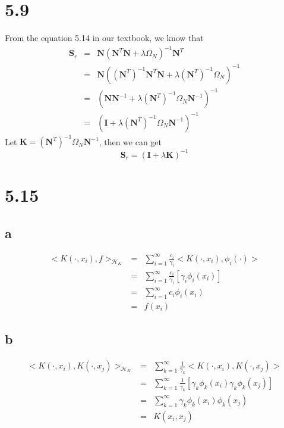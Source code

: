 \documentclass[11pt, oneside]{article}   	%
\begin{document}
\section{5.9}
From the equation 5.14 in our textbook, we know that 
\begin{eqnarray}
\mathbf{S}_r &=& \mathbf{N} (\mathbf{N}^T\mathbf{N} + \lambda \Omega_N)^{-1}\mathbf{N}^{T} \\
&=& \mathbf{N} ((\mathbf{N}^{T} )^{-1} \mathbf{N}^T\mathbf{N}+ \lambda (\mathbf{N}^{T} )^{-1} \Omega_N)^{-1}\\
&=&   (\mathbf{N} \mathbf{N} ^{-1}+ \lambda (\mathbf{N}^{T} )^{-1} \Omega_N\mathbf{N} ^{-1})^{-1}\\
&=&   (\mathbf{I} + \lambda (\mathbf{N}^{T} )^{-1} \Omega_N\mathbf{N} ^{-1})^{-1}
\end{eqnarray}
Let $\mathbf{K} = (\mathbf{N}^{T} )^{-1} \Omega_N\mathbf{N} ^{-1}$, then we can get
\begin{equation}
\mathbf{S}_r = (\mathbf{I} + \lambda \mathbf{K} )^{-1}
\end{equation}

\section{5.15}
\subsection{a}

\begin{eqnarray}
<K(\cdot, x_i), f>_{\mathcal{H}_K} &=& \sum_{i=1}^{\infty} \frac{c_i}{\gamma_i} <K(\cdot, x_i), \phi_i(\cdot)>\\
&=& \sum_{i=1}^{\infty} \frac{c_i}{\gamma_i} [\gamma_i\phi_i(x_i)]\\
&=& \sum_{i=1}^{\infty} c_i \phi_i(x_i) \\
&=& f(x_i)
\end{eqnarray}

\subsection{b}

\begin{eqnarray}
<K(\cdot, x_i), K(\cdot, x_j)>_{\mathcal{H}_K} &=& \sum_{k=1}^{\infty} \frac{1}{\gamma_k} <K(\cdot, x_i), K(\cdot, x_j)>\\
&=& \sum_{k=1}^{\infty} \frac{1}{\gamma_k} [\gamma_k \phi_k(x_i) \gamma_k \phi_k(x_j)]\\
&=& \sum_{k=1}^{\infty}\gamma_k \phi_k(x_i) \phi_k(x_j)\\
&=& K(x_i, x_j)
\end{eqnarray}
\end{document}
